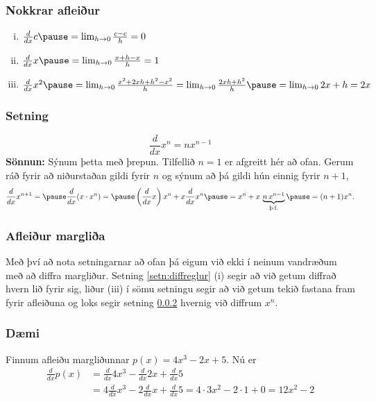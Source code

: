 \documentclass[icelandic,a4paper,12pt]{article}
\begin{document}
\subsubsection{Nokkrar afleiður}
\begin{enumerate}[(i)]
\item $\frac{d}{dx} c \pause=  \lim_{h\to 0} \frac{c-c}h = 0$
\item $\frac{d}{dx} x \pause=  \lim_{h\to 0} \frac{x+h-x}h = 1$
\item $\frac{d}{dx} x^2 \pause= \lim_{h\to 0} \frac{x^2+2xh+h^2-x^2}h
= \lim_{h\to 0} \frac{2xh + h^2}h \pause= \lim_{h\to 0} 2x+h= 2x$
\end{enumerate}
\pause

\subsubsection{Setning}\label{setn:diff_xn}
\begin{equation*}
	\frac{d}{dx} x^n = n x^{n-1}
\end{equation*}\pause
{\bf Sönnun:} Sýnum þetta með þrepun.\pause 
Tilfellið $n=1$ er afgreitt
hér að ofan. \pause Gerum ráð fyrir að niðurstaðan gildi fyrir $n$ og
sýnum að þá gildi hún einnig fyrir $n+1$,\pause
\begin{equation*}
	\frac{d}{dx} x^{n+1} =\pause \frac{d}{dx} (x\cdot x^n) = \pause
	\left(\frac{d}{dx} x\right) x^n + x\frac{d}{dx} x^n\pause
	= x^n + x\, 
	\underbrace{n\, x^{n-1}}_\text{þ.f.} \pause
	= (n+1) x^n.
\end{equation*}


\subsubsection{Afleiður margliða}
Með því að nota setningarnar að ofan þá eigum við ekki í neinum vandræðum með að 
diffra margliður. Setning \ref{setn:diffreglur} (i) segir að við getum diffrað 
hvern lið fyrir sig, liður (iii) í sömu setningu segir að við getum tekið fastana 
fram fyrir afleiðuna og loks segir setning \ref{setn:diff_xn} hvernig við 
diffrum $x^n$.

\subsubsection{Dæmi}
Finnum afleiðu margliðunnar $p(x) = 4x^3-2x + 5$. Nú er 
\begin{align*}
\frac{d}{dx} p(x) 
&= \frac{d}{dx}4x^3 - \frac{d}{dx}2x + \frac{d}{dx}5 \\
&= 4\frac{d}{dx}x^3 -2\frac{d}{dx}x + \frac{d}{dx}5 =
4\cdot 3x^2 -2\cdot 1 + 0 = 12x^2-2
\end{align*}
\end{document}
